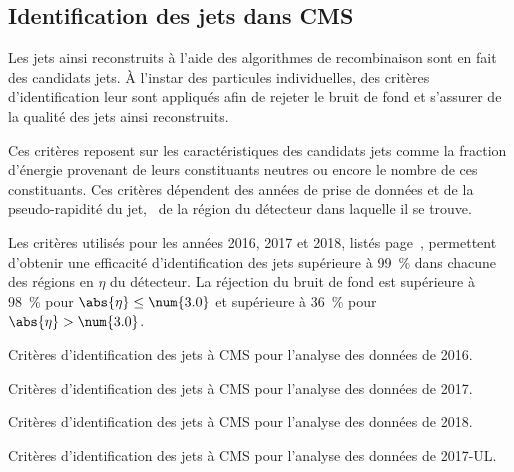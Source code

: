 \subsection{Identification des jets dans CMS}\label{chapter-JERC-section-jets_reco-subsec-jetID}
Les jets ainsi reconstruits à l'aide des algorithmes de recombinaison sont en fait des \og candidats \fg{} jets.
À l'instar des particules individuelles, des critères d'identification leur sont appliqués afin de rejeter le bruit de fond et s'assurer de la qualité des jets ainsi reconstruits.
\par Ces critères reposent sur les caractéristiques des candidats jets comme la fraction d'énergie provenant de leurs constituants neutres ou encore le nombre de ces constituants.
Ces critères dépendent des années de prise de données et de la pseudo-rapidité du jet, \ie\ de la région du détecteur dans laquelle il se trouve.
\par Les critères utilisés pour les années 2016, 2017 et 2018, listés page~\pageref{tab-chapter-JERC-section-jets_reco-subsec-jetID-2017UL}, permettent d'obtenir une efficacité d'identification des jets supérieure à \SI{99}{\%} dans chacune des régions en $\eta$ du détecteur.
La réjection du bruit de fond est supérieure à \SI{98}{\%} pour $\abs{\eta}\leq\num{3.0}$ et supérieure à \SI{36}{\%} pour $\abs{\eta}>\num{3.0}$.
\begin{table}[p]
\centering

\caption{Critères d'identification des jets à CMS pour l'analyse des données de 2016.}
\label{tab-chapter-JERC-section-jets_reco-subsec-jetID-2016}
\end{table}
\begin{table}[p]
\centering

\caption{Critères d'identification des jets à CMS pour l'analyse des données de 2017.}
\label{tab-chapter-JERC-section-jets_reco-subsec-jetID-2017}
\end{table}
\begin{table}[p]
\centering

\caption{Critères d'identification des jets à CMS pour l'analyse des données de 2018.}
\label{tab-chapter-JERC-section-jets_reco-subsec-jetID-2018}
\end{table}
\begin{table}[p]
\centering

\caption{Critères d'identification des jets à CMS pour l'analyse des données de 2017-UL.}
\label{tab-chapter-JERC-section-jets_reco-subsec-jetID-2017UL}
\end{table}
